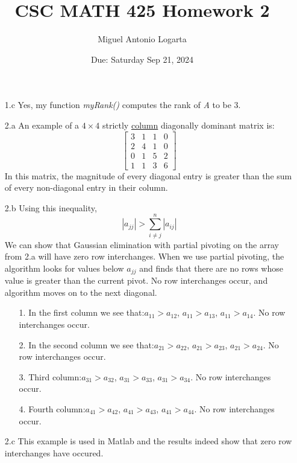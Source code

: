 \documentclass{article}
\title{CSC MATH 425 Homework 2}
\date{Due: Saturday Sep 21, 2024}
\author{Miguel Antonio Logarta}
\begin{document}
\maketitle  %

\begin{itemize}
\item[1.c] Yes, my function \textit{myRank()} computes the rank of \textit{A} to be 3.
\item[2.a] An example of a $4 \times 4$ strictly \underline{column} diagonally dominant matrix is:$$\begin{bmatrix} 3&1&1&0 \\ 2&4&1&0 \\ 0&1&5&2 \\ 1&1&3&6\end{bmatrix}$$In this matrix, the magnitude of every diagonal entry is greater than the sum of every non-diagonal entry in their column.
\item[2.b]Using this inequality, $${\displaystyle |a_{jj}|> \sum ^{n}_{i\neq j}|a_{ij}|}$$ We can show that Gaussian elimination with partial pivoting on the array from 2.a will have zero row interchanges. When we use partial pivoting, the algorithm looks for values below $a_{jj}$ and finds that there are no rows whose value is greater than the current pivot. No row interchanges occur, and algorithm moves on to the next diagonal.

\begin{itemize}
    \item[1.] In the first column we see that:\newline $a_{11} > a_{12}$, $a_{11} > a_{13}$, $a_{11} > a_{14}$. \newline No row interchanges occur.
    \item[2.] In the second column we see that:\newline $a_{21} > a_{22}$, $a_{21} > a_{23}$, $a_{21} > a_{24}$. \newline No row interchanges occur. 
    \item[3.] Third column:\newline $a_{31} > a_{32}$, $a_{31} > a_{33}$, $a_{31} > a_{34}$. \newline No row interchanges occur.
    \item[4.] Fourth column:\newline $a_{41} > a_{42}$, $a_{41} > a_{43}$, $a_{41} > a_{44}$. \newline No row interchanges occur.
\end{itemize}

\item[2.c] This example is used in Matlab and the results indeed show that zero row interchanges have occured. 
\end{itemize}
\end{document}

